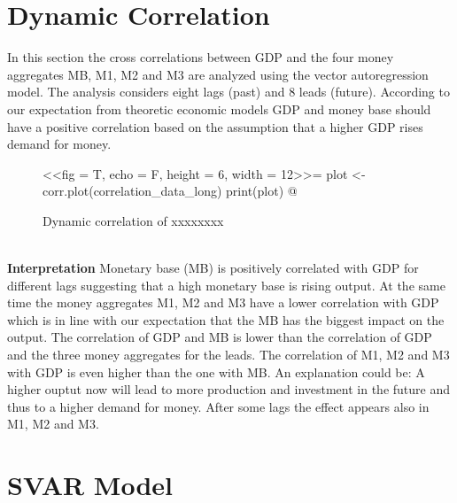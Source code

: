 \documentclass[11pt,a4paper]{report}
\begin{document}
\section{Dynamic Correlation}

In this section the cross correlations between GDP and the four money aggregates MB, M1, M2 and M3 are analyzed using the vector autoregression model. The analysis considers eight lags (past) and 8 leads (future). According to our expectation from theoretic economic models GDP and money base should have a positive correlation based on the assumption that a higher GDP rises demand for money.

\begin{figure}[H]
\caption{Dynamic correlation of xxxxxxxx}
\label{dyn_corr}
\centering
<<fig = T, echo = F, height = 6, width = 12>>=
plot <- corr.plot(correlation_data_long)
print(plot)
@
\end{figure} \ \\\textbf{Interpretation}
\newline
Monetary base (MB) is positively correlated with GDP for different lags suggesting that a high monetary base is rising output. At the same time the money aggregates M1, M2 and M3 have a lower correlation with GDP which is in line with our expectation that the MB has the biggest impact on the output.
\newline
The correlation of GDP and MB is lower than the correlation of GDP and the three money aggregates for the leads. The correlation of M1, M2 and M3 with GDP is even higher than the one with MB. An explanation could be: A higher ouptut now will lead to more production and investment in the future and thus to a higher demand for money. After some lags the effect appears also in M1, M2 and M3.


\newpage
\section{SVAR Model}
\end{document}

